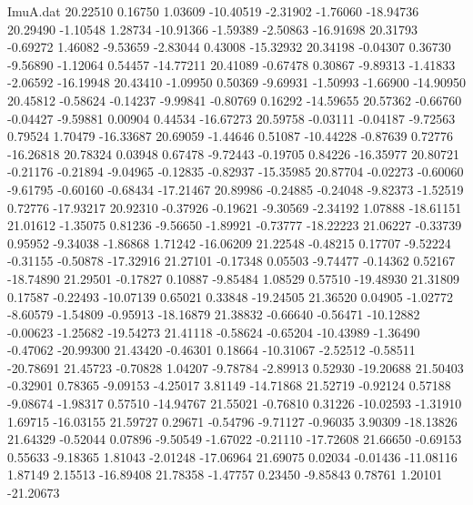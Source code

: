 \begin{filecontents}{ImuA.dat}
  20.22510    0.16750    1.03609  -10.40519   -2.31902   -1.76060  -18.94736
  20.29490   -1.10548    1.28734  -10.91366   -1.59389   -2.50863  -16.91698
  20.31793   -0.69272    1.46082   -9.53659   -2.83044    0.43008  -15.32932
  20.34198   -0.04307    0.36730   -9.56890   -1.12064    0.54457  -14.77211
  20.41089   -0.67478    0.30867   -9.89313   -1.41833   -2.06592  -16.19948
  20.43410   -1.09950    0.50369   -9.69931   -1.50993   -1.66900  -14.90950
  20.45812   -0.58624   -0.14237   -9.99841   -0.80769    0.16292  -14.59655
  20.57362   -0.66760   -0.04427   -9.59881    0.00904    0.44534  -16.67273
  20.59758   -0.03111   -0.04187   -9.72563    0.79524    1.70479  -16.33687
  20.69059   -1.44646    0.51087  -10.44228   -0.87639    0.72776  -16.26818
  20.78324    0.03948    0.67478   -9.72443   -0.19705    0.84226  -16.35977
  20.80721   -0.21176   -0.21894   -9.04965   -0.12835   -0.82937  -15.35985
  20.87704   -0.02273   -0.60060   -9.61795   -0.60160   -0.68434  -17.21467
  20.89986   -0.24885   -0.24048   -9.82373   -1.52519    0.72776  -17.93217
  20.92310   -0.37926   -0.19621   -9.30569   -2.34192    1.07888  -18.61151
  21.01612   -1.35075    0.81236   -9.56650   -1.89921   -0.73777  -18.22223
  21.06227   -0.33739    0.95952   -9.34038   -1.86868    1.71242  -16.06209
  21.22548   -0.48215    0.17707   -9.52224   -0.31155   -0.50878  -17.32916
  21.27101   -0.17348    0.05503   -9.74477   -0.14362    0.52167  -18.74890
  21.29501   -0.17827    0.10887   -9.85484    1.08529    0.57510  -19.48930
  21.31809    0.17587   -0.22493  -10.07139    0.65021    0.33848  -19.24505
  21.36520    0.04905   -1.02772   -8.60579   -1.54809   -0.95913  -18.16879
  21.38832   -0.66640   -0.56471  -10.12882   -0.00623   -1.25682  -19.54273
  21.41118   -0.58624   -0.65204  -10.43989   -1.36490   -0.47062  -20.99300
  21.43420   -0.46301    0.18664  -10.31067   -2.52512   -0.58511  -20.78691
  21.45723   -0.70828    1.04207   -9.78784   -2.89913    0.52930  -19.20688
  21.50403   -0.32901    0.78365   -9.09153   -4.25017    3.81149  -14.71868
  21.52719   -0.92124    0.57188   -9.08674   -1.98317    0.57510  -14.94767
  21.55021   -0.76810    0.31226  -10.02593   -1.31910    1.69715  -16.03155
  21.59727    0.29671   -0.54796   -9.71127   -0.96035    3.90309  -18.13826
  21.64329   -0.52044    0.07896   -9.50549   -1.67022   -0.21110  -17.72608
  21.66650   -0.69153    0.55633   -9.18365    1.81043   -2.01248  -17.06964
  21.69075    0.02034   -0.01436  -11.08116    1.87149    2.15513  -16.89408
  21.78358   -1.47757    0.23450   -9.85843    0.78761    1.20101  -21.20673

\end{filecontents}
